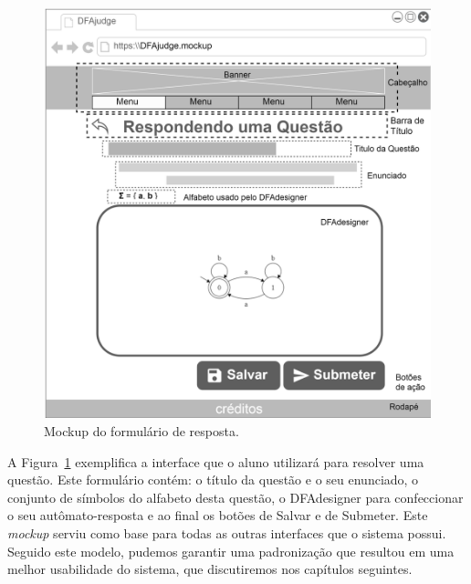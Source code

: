 \documentclass[
	12pt,				%
	openany,
	oneside,
	a4paper,			%
	english,			%
	brazil				%
	]{abntex2}
\begin{document}
\begin{figure}[H]
  \centering
  \includegraphics[width=\textwidth]{mockupDFAdesigner.png}%
  \caption{Mockup do formulário de resposta.}
  \label{fig:mockupDFAdesigner}
  \vspace{-0.5cm}
\end{figure}

  A Figura~\ref{fig:mockupDFAdesigner} exemplifica a interface que o aluno utilizará para resolver uma questão. Este formulário contém: o título da questão e o seu enunciado, o conjunto de símbolos do alfabeto desta questão, o DFAdesigner para confeccionar o seu autômato-resposta e ao final os botões de Salvar e de Submeter. Este \textit{mockup} serviu como base para todas as outras interfaces que o sistema possui. Seguido este modelo, pudemos garantir uma padronização que resultou em uma melhor usabilidade do sistema, que discutiremos nos capítulos seguintes.
\end{document}
